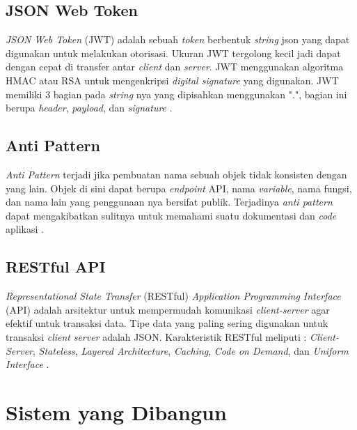 \subsection{JSON Web Token}
\textit{JSON Web Token} (JWT) adalah sebuah \textit{token} berbentuk \textit{string} json yang dapat digunakan untuk melakukan otorisasi. Ukuran JWT tergolong kecil jadi dapat dengan cepat di transfer antar \textit{client} dan \textit{server}. JWT menggunakan algoritma HMAC atau RSA untuk mengenkripsi \textit{digital signature} yang digunakan. JWT memiliki 3 bagian pada \textit{string} nya yang dipisahkan menggunakan ".", bagian ini berupa \textit{header}, \textit{payload}, dan \textit{signature} \cite{rahmatullo2019stateless}.

\subsection{Anti Pattern}
\textit{Anti Pattern} terjadi jika pembuatan nama sebuah objek tidak konsisten dengan yang lain. Objek di sini dapat berupa \textit{endpoint} API, nama \textit{variable}, nama fungsi, dan nama lain yang penggunaan nya bersifat publik. Terjadinya \textit{anti pattern} dapat mengakibatkan sulitnya untuk memahami suatu dokumentasi dan \textit{code} aplikasi \cite{Aghajani2018} \cite{Alshraiedeh2021}.

\subsection{RESTful API}
\textit{Representational State Transfer} (RESTful) \textit{Application Programming Interface} (API) adalah arsitektur untuk mempermudah komunikasi \textit{client-server} agar efektif untuk transaksi data. Tipe data yang paling sering digunakan untuk transaksi \textit{client} \textit{server} adalah JSON. Karakteristik RESTful meliputi : \textit{Client-Server}, \textit{Stateless}, \textit{Layered Architecture}, \textit{Caching}, \textit{Code on Demand}, dan \textit{Uniform Interface} \cite{giessler2015best}.

\newpage
\section{Sistem yang Dibangun}

